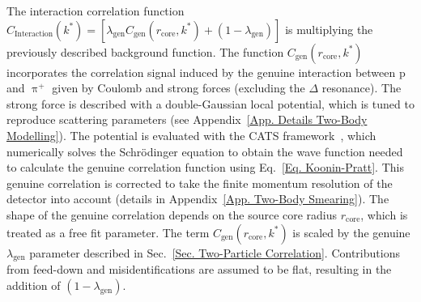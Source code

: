\documentclass[ALICE,manyauthors]{cernphprep}
\begin{document}
 The interaction correlation function $ C_\text{Interaction}(k^*) = \left[ \lambda_{\text{gen}}C_{\text{gen}}(r_\text{core}, k^*) + (1-\lambda_{\text{gen}}) \right ]$ is multiplying the previously described background function. The function $C_{\text{gen}}(r_\text{core}, k^*)$ incorporates the correlation signal induced by the genuine interaction between p and $\uppi^+$ given by Coulomb and strong forces (excluding the $\Delta$ resonance). The strong force is described with a double-Gaussian local potential, which is tuned to reproduce scattering parameters (see Appendix~\ref{App. Details Two-Body Modelling}). The potential is evaluated with the CATS framework~\cite{Mihaylov:2018rva}, which numerically solves the Schrödinger equation to obtain the wave function needed to calculate the genuine correlation function using Eq.~\eqref{Eq. Koonin-Pratt}. This genuine correlation is corrected to take the finite momentum resolution of the detector into account (details in Appendix~\ref{App. Two-Body Smearing}). The shape of the genuine correlation depends on the source core radius $r_\text{core}$, which is treated as a free fit parameter. The term $C_{\text{gen}}(r_\text{core}, k^*)$ is scaled by the genuine $\lambda_{\text{gen}}$ parameter described in Sec.~\ref{Sec. Two-Particle Correlation}. Contributions from feed-down and misidentifications are assumed to be flat, resulting in the addition of $(1-\lambda_{\text{gen}})$.
\end{document}
